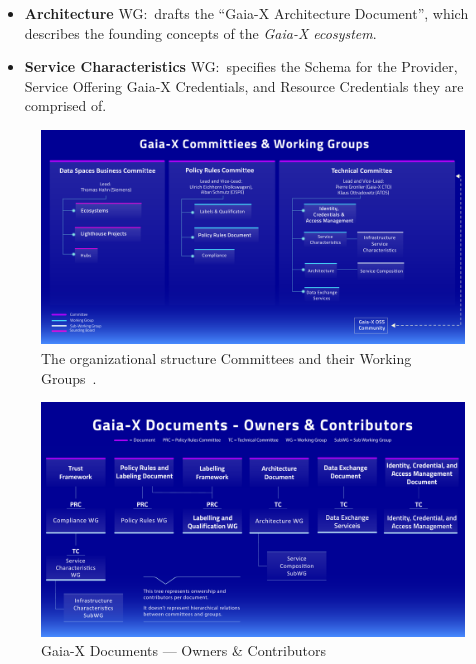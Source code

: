 \begin{itemize}
    \item \textbf{Architecture} WG:~drafts the ``Gaia-X Architecture Document'', which describes the founding concepts of the \textit{Gaia-X ecosystem}.
    \item \textbf{Service Characteristics} WG:~specifies the Schema for the Provider, Service Offering Gaia-X Credentials, and Resource Credentials they are comprised of.
\end{itemize}

\begin{figure}
    \centering
    \includegraphics[width=\textwidth]{figures/committees-and-working-groups.pdf}
    \caption{The organizational structure Committees and their Working Groups~\cite{gaiax}.}\label{fig:organizational-committees-structure}
\end{figure}

\begin{figure}
    \centering
    \includegraphics[width=\textwidth]{figures/committees-owners-and-contributors.pdf}
    \caption{Gaia-X Documents --- Owners \& Contributors~\cite{gaiax}}\label{fig:gaiax-documents-owners-and-contributors}
\end{figure}

